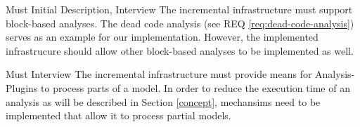 \documentclass[a4paper]{article}
\begin{document}
\begin{req}\label{req:analysis-types}
	\reqtable
	{Must}  {Initial Description, Interview}
	{The incremental infrastructure must support block-based analyses. }
	{The dead code analysis (see REQ \ref{req:dead-code-analysis}) serves as an example for our implementation. However, the implemented infrastrucure should allow other block-based analyses to be implemented as well.}
\end{req}
\vspace{1em}


\begin{req} \label{req:partial-models}
\reqtable
	{Must}  {Interview}
	{The incremental infrastructure must provide means for Analysis-Plugins to process parts of a model.}
	{In order to reduce the execution time of an analysis as will be described in Section \ref{concept}, mechansims need to be implemented that allow it to process partial models.}
\end{req}
\vspace{1em}
\end{document}
